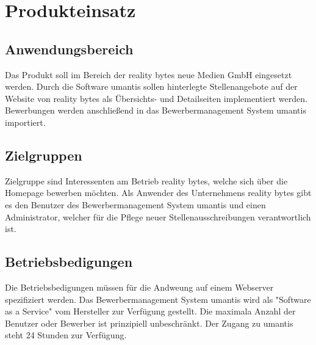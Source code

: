 \section{Produkteinsatz}

    \subsection{Anwendungsbereich}

        Das Produkt soll im Bereich der reality bytes neue Medien GmbH eingesetzt werden. Durch die Software umantis sollen hinterlegte Stellenangebote auf der Website von reality bytes als Übersichts- und Detailseiten implementiert werden. Bewerbungen werden anschließend in das Bewerbermanagement System umantis importiert.

    \subsection{Zielgruppen}

        Zielgruppe sind Interessenten am Betrieb reality bytes, welche sich über die Homepage bewerben möchten. Als Anwender des Unternehmens reality bytes gibt es den Benutzer des Bewerbermanagement System umantis und einen Administrator, welcher für die Pflege neuer Stellenausschreibungen verantwortlich ist.

    \subsection{Betriebsbedigungen}

        Die Betriebsbedigungen müssen für die Andweung auf einem Webserver spezifiziert werden. Das Bewerbermanagement System umantis wird als "Software as a Service" vom Hersteller zur Verfügung gestellt. Die maximala Anzahl der Benutzer oder Bewerber ist prinzipiell unbeschränkt. Der Zugang zu umantis steht 24 Stunden zur Verfügung.